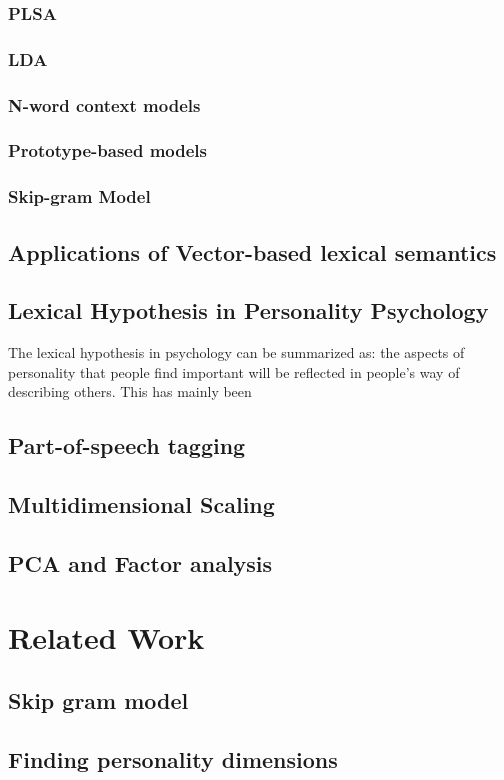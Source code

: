 \documentclass[eric_thesis.tex]{subfiles}
\begin{document}
\subsection{PLSA}

\subsection{LDA}

\subsection{N-word context models}

\subsection{Prototype-based models}

\subsection{Skip-gram Model}

\section{Applications of Vector-based lexical semantics}


\section{Lexical Hypothesis in Personality Psychology}


The lexical hypothesis in psychology can be summarized as: the aspects of personality that people find important will be reflected in people's way of describing others. This has mainly been

\section{Part-of-speech tagging}

\section{Multidimensional Scaling}

\section{PCA and Factor analysis}

\chapter{Related Work}

\section{Skip gram model}

\section{Finding personality dimensions}
\end{document}
